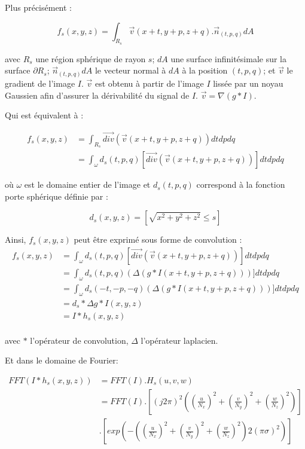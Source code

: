 Plus précisément :

\begin{equation}
  f_s(x,y,z) = \int_{R_s}\vec{v}(x+t,y+p, z+q) . \vec{n}_{(t,p,q)}dA
\end{equation}

avec $R_s$ une région sphérique de rayon $s$; $dA$ une surface infinitésimale sur la surface $\partial R_s$; $\vec{n}_{(t,p,q)}dA$ le vecteur normal à $dA$ à la position $(t,p,q)$; et $\vec{v}$ le gradient de l'image $I$. $\vec{v}$ est obtenu à partir de l'image $I$ lissée par un noyau Gaussien afin d'assurer la dérivabilité du signal de $I$. $\vec{v}=\nabla(g*I)$.

Qui est équivalent à :

\begin{align}
  f_s(x,y,z) & = \int_{R_s} \vec{div}( \vec{v}(x+t,y+p, z+q) ) dtdpdq \\
  & = \int_{\omega} d_s(t,p,q) [\vec{div}( \vec{v}(x+t,y+p, z+q) )] dtdpdq
\end{align}

où $\omega$ est le domaine entier de l'image et $d_s(t,p,q)$ correspond à la fonction porte sphérique définie par :

\begin{equation}
d_s(x,y,z) = [\sqrt{x^2 + y^2 + z^2} \leq s]
\end{equation}

Ainsi, $f_s(x,y,z)$ peut être exprimé sous forme de convolution :
\begin{align}
  f_s(x,y,z) & = \int_{\omega} d_s(t,p,q) [\vec{div}( \vec{v}(x+t,y+p, z+q) )] dtdpdq \\
             & = \int_{\omega} d_s(t,p,q) (\Delta(g*I(x+t,y+p, z+q)))] dtdpdq \\
             & = \int_{\omega} d_s(-t,-p,-q) (\Delta(g*I(x+t,y+p, z+q)))] dtdpdq \\
             & = d_s * \Delta g * I(x,y,z) \\
             & = I * h_s(x,y,z) \\
\end{align}

avec $*$ l'opérateur de convolution, $\Delta$ l'opérateur laplacien.

Et dans le domaine de Fourier:

\begin{align}
  FFT( I * h_s(x,y,z) ) &= FFT(I) . H_s(u,v,w) \\
                       &= FFT(I) . [ (j2 \pi)^2 ( (\frac{u}{N_x})^2 + (\frac{v}{N_y})^2 + (\frac{w}{N_z})^2 ) ] \\
                       & . [ exp( -( (\frac{u}{N_x})^2 + (\frac{v}{N_y})^2 + (\frac{w}{N_z})^2 ) 2(\pi\sigma)^2 ) ]
\end{align}


